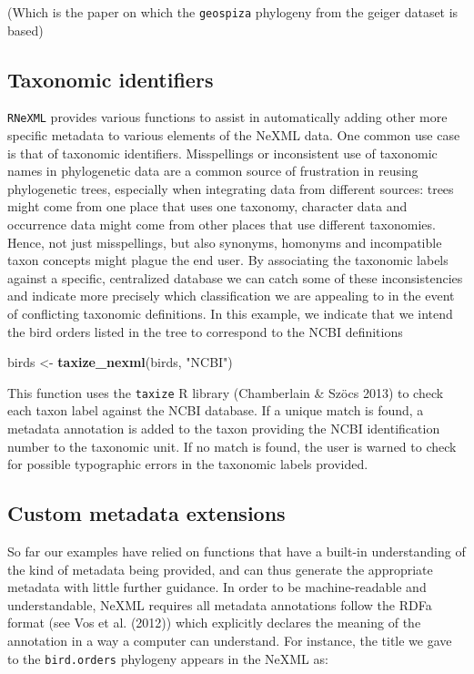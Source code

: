 \documentclass[author-year, review, 11pt]{components/elsarticle} %
\newenvironment{Shaded}{\begin{snugshade}}{\end{snugshade}}
\newcommand{\KeywordTok}[1]{\textcolor[rgb]{0.13,0.29,0.53}{\textbf{{#1}}}}
\newcommand{\StringTok}[1]{\textcolor[rgb]{0.31,0.60,0.02}{{#1}}}
\newcommand{\NormalTok}[1]{{#1}}
\begin{document}
(Which is the paper on which the \texttt{geospiza} phylogeny from the
geiger dataset is based)

\subsection{Taxonomic identifiers}\label{taxonomic-identifiers}

\texttt{RNeXML} provides various functions to assist in automatically
adding other more specific metadata to various elements of the NeXML
data. One common use case is that of taxonomic identifiers. Misspellings
or inconsistent use of taxonomic names in phylogenetic data are a common
source of frustration in reusing phylogenetic trees, especially when
integrating data from different sources: trees might come from one place
that uses one taxonomy, character data and occurrence data might come
from other places that use different taxonomies. Hence, not just
misspellings, but also synonyms, homonyms and incompatible taxon
concepts might plague the end user. By associating the taxonomic labels
against a specific, centralized database we can catch some of these
inconsistencies and indicate more precisely which classification we are
appealing to in the event of conflicting taxonomic definitions. In this
example, we indicate that we intend the bird orders listed in the tree
to correspond to the NCBI definitions

\begin{Shaded}
\begin{Highlighting}[]
\NormalTok{birds <-}\StringTok{ }\KeywordTok{taxize_nexml}\NormalTok{(birds, }\StringTok{"NCBI"}\NormalTok{)}
\end{Highlighting}
\end{Shaded}

This function uses the \texttt{taxize} R library (Chamberlain \& Sz{ö}cs
2013) to check each taxon label against the NCBI database. If a unique
match is found, a metadata annotation is added to the taxon providing
the NCBI identification number to the taxonomic unit. If no match is
found, the user is warned to check for possible typographic errors in
the taxonomic labels provided.

\subsection{Custom metadata
extensions}\label{custom-metadata-extensions}

So far our examples have relied on functions that have a built-in
understanding of the kind of metadata being provided, and can thus
generate the appropriate metadata with little further guidance. In order
to be machine-readable and understandable, NeXML requires all metadata
annotations follow the RDFa format (see Vos et al. (2012)) which
explicitly declares the meaning of the annotation in a way a computer
can understand. For instance, the title we gave to the
\texttt{bird.orders} phylogeny appears in the NeXML as:
\end{document}
